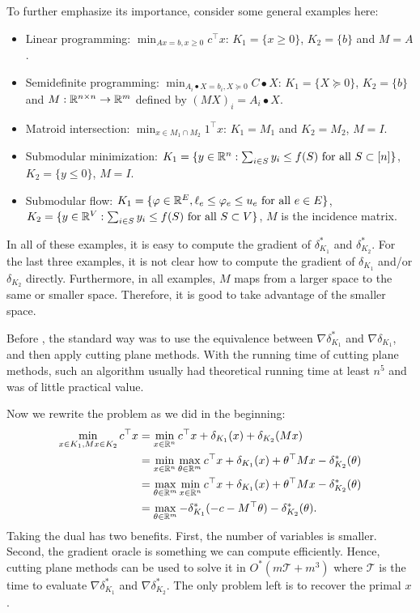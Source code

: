 To further emphasize its importance, consider some general examples
here:
\begin{itemize}
\item Linear programming: $\min_{Ax=b,x\geq0}c^{\top}x$: $K_{1}=\{x\geq0\}$,
$K_{2}=\{b\}$ and $M=A$.
\item Semidefinite programming: $\min_{A_{i}\bullet X=b_{i},X\succeq0}C\bullet X$:
$K_{1}=\{X\succeq0\}$, $K_{2}=\{b\}$ and $M:\mathbb{R}^{n\times n}\rightarrow\mathbb{R}^{m}$
defined by $(MX)_{i}=A_{i}\bullet X$.
\item Matroid intersection: $\min_{x\in M_{1}\cap M_{2}}1^{\top}x$: $K_{1}=M_{1}$
and $K_{2}=M_{2}$, $M=I$.
\item Submodular minimization: $K_{1}=\{y\in\mathbb{R}^{n}:\sum_{i\in S}y_{i}\leq f(S)\text{ for all }S\subset[n]\}$,
$K_{2}=\{y\leq0\}$, $M=I$.
\item Submodular flow: $K_{1}=\{\varphi\in\mathbb{R}^{E},\ell_{e}\leq\varphi_{e}\leq u_{e}\text{ for all }e\in E\}$,
$K_{2}=\{y\in\mathbb{R}^{V}:\sum_{i\in S}y_{i}\leq f(S)\text{ for all }S\subset V\}$,
$M$ is the incidence matrix.
\end{itemize}
In all of these examples, it is easy to compute the gradient of $\delta^{*}_{K_{1}}$
and $\delta^{*}_{K_{2}}$. For the last three examples, it is not
clear how to compute the gradient of $\delta_{K_{1}}$ and/or $\delta_{K_{2}}$
directly. Furthermore, in all examples, $M$ maps from a larger space
to the same or smaller space. Therefore, it is good to take advantage
of the smaller space.

Before \cite{lee2015faster}, the standard way was to use the equivalence
between $\nabla\delta^{*}_{K_{1}}$ and $\nabla\delta_{K_{1}}$, and
then apply cutting plane methods. With the running time of cutting
plane methods, such an algorithm usually had theoretical running time
at least $n^{5}$ and was of little practical value. 

Now we rewrite the problem as we did in the beginning:
\begin{align*}
\min_{x\in K_{1},Mx\in K_{2}}c^{\top}x & =\min_{x\in\mathbb{R}^{n}}c^{\top}x+\delta_{K_{1}}(x)+\delta_{K_{2}}(Mx)\\
 & =\min_{x\in\mathbb{R}^{n}}\max_{\theta\in\mathbb{R}^{m}}c^{\top}x+\delta_{K_{1}}(x)+\theta^{\top}Mx-\delta^{*}_{K_{2}}(\theta)\\
 & =\max_{\theta\in\mathbb{R}^{m}}\min_{x\in\mathbb{R}^{n}}c^{\top}x+\delta_{K_{1}}(x)+\theta^{\top}Mx-\delta^{*}_{K_{2}}(\theta)\\
 & =\max_{\theta\in\mathbb{R}^{m}}-\delta^{*}_{K_{1}}(-c-M^{\top}\theta)-\delta^{*}_{K_{2}}(\theta).
\end{align*}
Taking the dual has two benefits. First, the number of variables is
smaller. Second, the gradient oracle is something we can compute efficiently.
Hence, cutting plane methods can be used to solve it in $O^{*}(m\mathcal{T}+m^{3})$
where $\mathcal{T}$ is the time to evaluate $\nabla\delta^{*}_{K_{1}}$
and $\nabla\delta^{*}_{K_{2}}$. The only problem left is to recover
the primal $x$.

